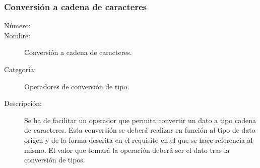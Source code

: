 \subsubsection{Conversión a cadena de caracteres}
	\begin{description}
		\item [Número:] \cn
		\item [Nombre:] Conversión a cadena de caracteres.
		\item [Categoría:] Operadores de conversión de tipo.
		\item [Descripción:] Se ha de facilitar un operador que permita convertir un dato a tipo cadena de caracteres. Esta conversión
		se deberá realizar en función al tipo de dato origen y de la forma descrita en el requisito en el que se hace referencia al mismo.
		El valor que tomará la operación deberá ser el dato tras la conversión de tipos.
	\end {description}

